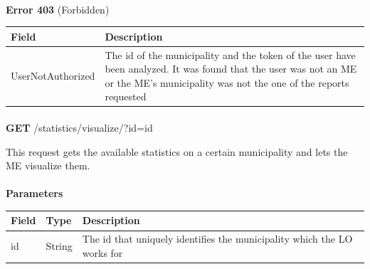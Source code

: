 						\paragraph{}
							\textbf{Error 403} (Forbidden)
							\begin{table}[!h]
								\begin{tabular}{L{0.4\textwidth}L{0.4\textwidth}}
									\toprule
									Field & Description \\
									\midrule
								  	UserNotAuthorized & The id of the municipality and the token of the user have been analyzed. It was found that the user was not an ME or the ME's municipality was not the one of the reports requested \\
								 	\bottomrule
								\end{tabular}
							\end{table}
							
						\paragraph{}
						\textbf{GET} /statistics/visualize/?id={id}
						
						This request gets the available statistics on a certain municipality and lets the ME visualize them.
						\paragraph{}
							\textbf{Parameters}
							\begin{table}[!h]
								\begin{tabular}{L{0.2\textwidth}L{0.2\textwidth}L{0.4\textwidth}}
									\toprule
									Field & Type & Description \\
									\midrule
								 	id & String & The id that uniquely identifies the municipality which the LO works for \\
								 	\bottomrule
								\end{tabular}
							\end{table}
